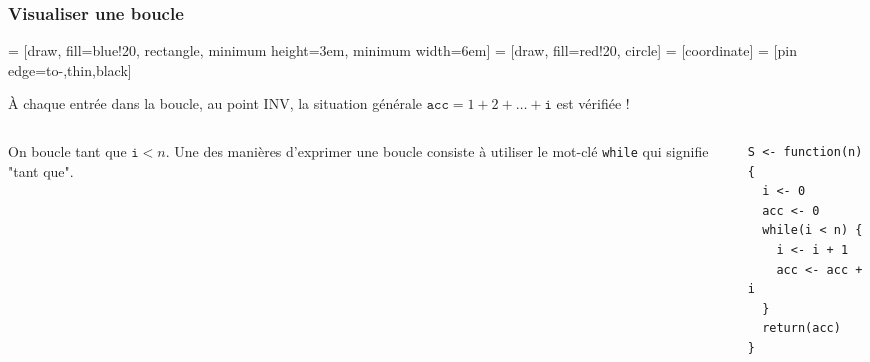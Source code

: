 \documentclass[10pt]{beamer}
\begin{document}
\begin{frame}[fragile]
  \frametitle{Visualiser une boucle}
   = [draw, fill=blue!20, rectangle, minimum height=3em, minimum width=6em]
 = [draw, fill=red!20, circle]
 = [coordinate]
 = [pin edge={to-,thin,black}]


    À chaque entrée dans la boucle, au point INV, la situation générale $\mathtt{acc} = 1 + 2 + \dots + \mathtt{i}$ est vérifiée !

\begin{columns}[c]
\begin{column}{0.48\textwidth}
  On boucle tant que $\mathtt{i} < n$.
  Une des manières d'exprimer une boucle consiste à utiliser le mot-clé \texttt{while} qui signifie "tant que".
\end{column}
\begin{column}{0.48\textwidth}
\begin{lstlisting}[style=editor]
S <- function(n) {
  i <- 0
  acc <- 0
  while(i < n) {
    i <- i + 1
    acc <- acc + i
  }
  return(acc)
}  
\end{lstlisting}
\end{column}
\end{columns}
\end{frame}
\end{document}
